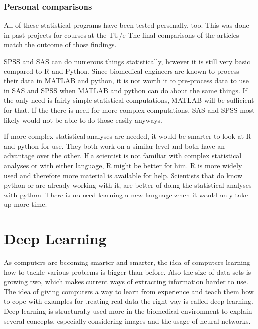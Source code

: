 \documentclass[10pt,a4paper]{report}
\begin{document}
	\subsubsection{Personal comparisons}
	
	All of these statistical programs have been tested personally, too. This 
	was done in past projects for courses at the TU/e The 
	final comparisons of the articles match the outcome of those findings. 
	
	SPSS and SAS can do numerous things statistically, however it is still very 
	basic compared to R and Python. Since biomedical engineers are known to 
	process their data in MATLAB and python, it is not worth it to pre-process 
	data to use in SAS and SPSS when MATLAB and python can do about the same 
	things. If the only need is fairly simple statistical computations, MATLAB 
	will be sufficient for that. If the there is need for more complex 
	computations, SAS and SPSS most likely would not be able to do those easily 
	anyways. 
	
	If more complex statistical analyses are needed, it would be smarter to 
	look at R and python for use. They both work on a similar level and both 
	have an advantage over the other. If a scientist is not familiar with 
	complex statistical analyses or with either language, R might be better for 
	him. R is more widely used and therefore more material is available for 
	help. Scientists that do know python or are already working with it, are 
	better of doing the statistical analyses with python. There is no need 
	learning a new language when it would only take up more time.
	
	\clearpage
	
	\section{Deep Learning}
	
	As computers are becoming smarter and smarter, the idea of computers 
	learning how to tackle various problems is bigger than before. Also the 
	size of data sets is growing two, which makes current ways of extracting 
	information harder to use. The idea of 
	giving computers a way to learn from experience and teach them how to cope 
	with examples for treating real data the right way is called deep learning. 
	\cite{Goodfellow-et-al-2016} Deep learning is structurally used more in the 
	biomedical environment to explain several concepts, especially considering 
	images and the usage of neural networks.\cite{greenspan2016guest}
	
\end{document}
